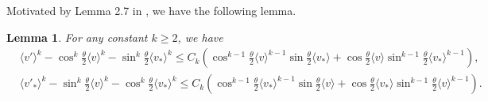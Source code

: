 \documentclass[reqno,10pt]{amsart}
\def\th{\theta}
\newcommand{\beq}{\begin{equation}}
\newcommand{\eeq}{\end{equation}}
\newtheorem{lem}{Lemma}[section]
\theoremstyle{definition}
\newtheorem{rmk}{Remark}[section]
\numberwithin{equation}{section}
\begin{document}
Motivated by Lemma 2.7 in \cite{CAO2022109641}, we have the following lemma.
\begin{lem}\label{lemma3.2}
    For any constant $k\ge2$, we have
    \beq\label{3.1}
    \begin{aligned}
&\langle v'\rangle^k-\cos^k\frac{\th}{2}\langle v\rangle^k-\sin^k\frac{\th}{2}\langle v_*\rangle^k\le C_k(\cos^{k-1}\frac{\th}{2}\langle v\rangle^{k-1}\sin\frac{\th}{2}\langle v_*\rangle+\cos\frac{\th}{2}\langle v\rangle\sin^{k-1}\frac{\th}{2}\langle v_*\rangle^{k-1}),\\
&\langle v'_*\rangle^k-\sin^k\frac{\th}{2}\langle v\rangle^k-\cos^k\frac{\th}{2}\langle v_*\rangle^k\le C_k(\cos^{k-1}\frac{\th}{2}\langle v_*\rangle^{k-1}\sin\frac{\th}{2}\langle v\rangle+\cos\frac{\th}{2}\langle v_*\rangle\sin^{k-1}\frac{\th}{2}\langle v\rangle^{k-1}).
\end{aligned}
    \eeq
\end{lem}
\end{document}
